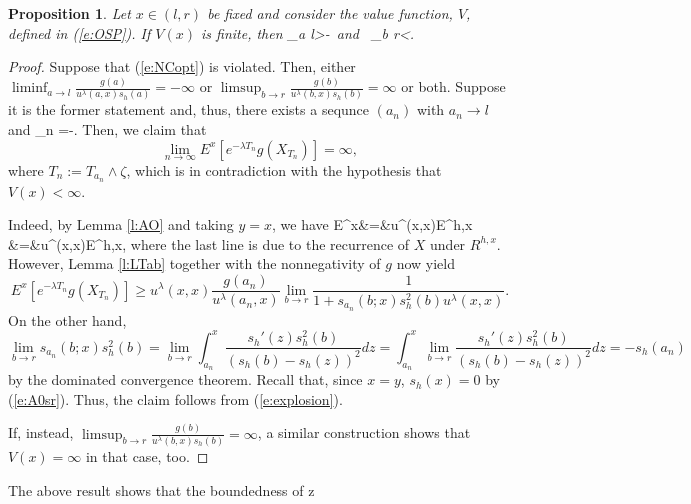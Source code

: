 \documentclass[11pt,reqno]{amsart}
\numberwithin{equation}{section}
\newtheorem{proposition}{Proposition}[section]
\def\rar{\rightarrow}
\begin{document}
\begin{proposition}\label{p:Vfinite}
	Let $x \in (l,r)$ be fixed and consider the value function, $V$, defined in (\ref{e:OSP}). If $V(x)$ is finite, then
	\be \label{e:NCopt}
	\liminf_{a \rar l}>-\infty \mbox{ and } \limsup_{b \rar r}<\infty.
	\ee
\end{proposition}
\begin{proof}
	Suppose that (\ref{e:NCopt}) is violated. Then, either $\liminf_{a \rar l}\frac{g(a)}{u^{\lambda}(a,x)s_h(a)}=-\infty$ or $\limsup_{b \rar r}\frac{g(b)}{u^{\lambda}(b,x)s_h(b)}=\infty$ or both. Suppose it is the former statement and, thus, there exists a sequnce $(a_n)$ with $a_n \rar l$ and 
		\be \label{e:explosion}
		\lim_{n \rar \infty}=-\infty.
		\ee
	Then, we claim that 
	\[
	\lim_{n \rar \infty} E^x\left[e^{-\lambda T_{n}}g(X_{T_n})\right]=\infty,
	\]
	where $T_n :=T_{a_n}\wedge \zeta$, which is in contradiction with  the hypothesis that $V(x)<\infty$. 
	
	Indeed, by Lemma \ref{l:AO}  and taking $y=x$, we have
	\bean
	E^x&=&u^{\lambda}(x,x)E^{h,x}\\
	&=&u^{\lambda}(x,x)E^{h,x},
	\eean
	where the last line is due to the recurrence of $X$ under $R^{h,x}$. However, Lemma \ref{l:LTab} together with the nonnegativity of $g$ now yield
	\[
	E^x\left[e^{-\lambda T_{n}} g(X_{T_n})\right]\geq u^{\lambda}(x,x)\frac{g(a_n)}{u^{\lambda}(a_n,x)}\lim_{b \rar r}\frac{1}{1+s_{a_n}(b;x)s_h^2(b)u^{\lambda}(x,x)}.
	\]
	On the other hand,
	\[
	\lim_{b \rar r}s_{a_n}(b;x)s_h^2(b)=\lim_{b \rar r}\int_{a_n}^x\frac{s_h'(z)s_h^2(b)}{(s_h(b)-s_h(z))^2}dz=\int_{a_n}^x\lim_{b \rar r}\frac{s_h'(z)s_h^2(b)}{(s_h(b)-s_h(z))^2}dz=-s_h(a_n)
	\]
	by the dominated convergence theorem. Recall that, since $x=y$, $s_h(x)=0$ by (\ref{e:A0sr}). Thus, the claim follows from (\ref{e:explosion}). 
	
	If, instead, $\limsup_{b \rar r}\frac{g(b)}{u^{\lambda}(b,x)s_h(b)}=\infty$, a similar construction  shows that $V(x)=\infty$ in that case, too. 
	\end{proof}
The above result shows that the boundedness of
\be \label{e:nc0}
z \mapsto {}
\end{document}
